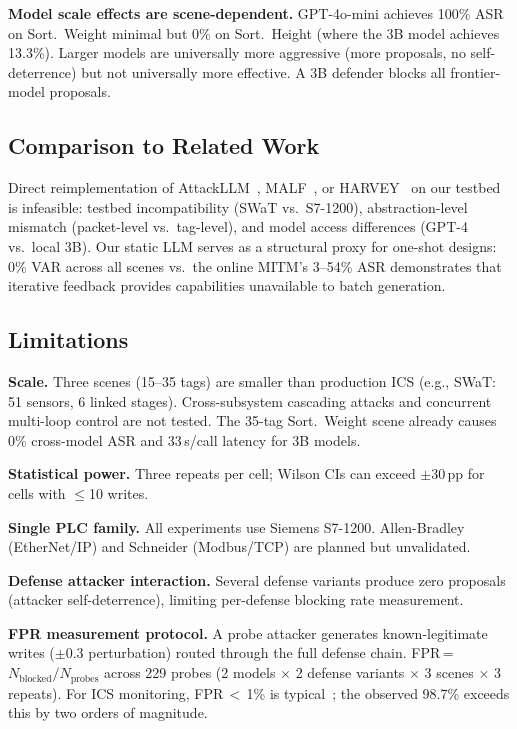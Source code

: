 \textbf{Model scale effects are scene-dependent.} GPT-4o-mini achieves 100\% ASR on Sort.~Weight minimal but 0\% on Sort.~Height (where the 3B model achieves 13.3\%). Larger models are universally more aggressive (more proposals, no self-deterrence) but not universally more effective. A 3B defender blocks all frontier-model proposals.

\subsection{Comparison to Related Work}

Direct reimplementation of AttackLLM~\cite{ahmed2025attackllm}, MALF~\cite{ning2025malf}, or HARVEY~\cite{garcia2017harvey} on our testbed is infeasible: testbed incompatibility (SWaT vs.\ S7-1200), abstraction-level mismatch (packet-level vs.\ tag-level), and model access differences (GPT-4 vs.\ local 3B). Our static LLM serves as a structural proxy for one-shot designs: 0\% VAR across all scenes vs.\ the online MITM's 3--54\% ASR demonstrates that iterative feedback provides capabilities unavailable to batch generation.

\subsection{Limitations}

\textbf{Scale.} Three scenes (15--35 tags) are smaller than production ICS (e.g., SWaT: 51 sensors, 6 linked stages). Cross-subsystem cascading attacks and concurrent multi-loop control are not tested. The 35-tag Sort.~Weight scene already causes 0\% cross-model ASR and 33\,s/call latency for 3B models.

\textbf{Statistical power.} Three repeats per cell; Wilson CIs can exceed $\pm$30\,pp for cells with $\leq$10 writes.

\textbf{Single PLC family.} All experiments use Siemens S7-1200. Allen-Bradley (EtherNet/IP) and Schneider (Modbus/TCP) are planned but unvalidated.

\textbf{Defense attacker interaction.} Several defense variants produce zero proposals (attacker self-deterrence), limiting per-defense blocking rate measurement.

\textbf{FPR measurement protocol.} A probe attacker generates known-legitimate writes ($\pm 0.3$ perturbation) routed through the full defense chain. FPR\,=\,$N_{\text{blocked}}/N_{\text{probes}}$ across 229 probes (2 models $\times$ 2 defense variants $\times$ 3 scenes $\times$ 3 repeats). For ICS monitoring, FPR\,$<$\,1\% is typical~\cite{moriano2025adaptive_anomaly}; the observed 98.7\% exceeds this by two orders of magnitude.
